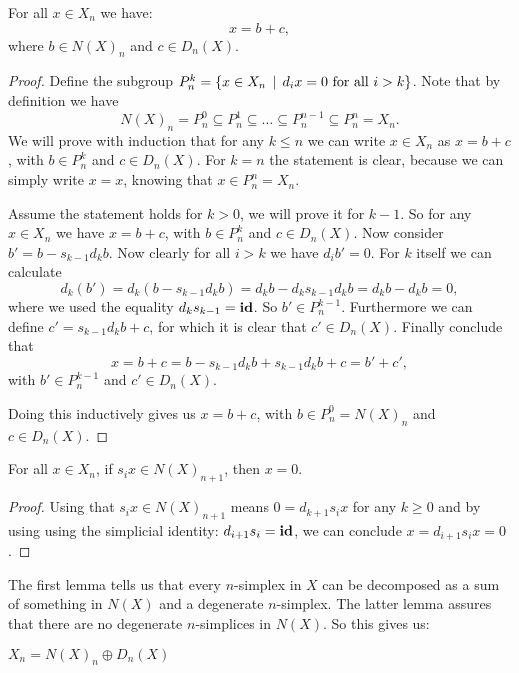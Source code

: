 \begin{lemma}
	\label{le:decomp1}
	For all $x \in X_n$ we have:
	$$ x = b + c,$$
	where $b \in N(X)_n$ and $c \in D_n(X)$.
\end{lemma}
\begin{proof}
	Define the subgroup $P_n^k = \{ x \in X_n \,\mid\, d_i x = 0 \text{ for all } i > k\}$. Note that by definition we have
	$$ N(X)_n = P_n^0 \subseteq P_n^1 \subseteq \ldots \subseteq P_n^{n-1} \subseteq P_n^n = X_n. $$
	We will prove with induction that for any $k \leq n$ we can write $x \in X_n$ as $x = b + c$, with $b \in P_n^k$ and $c \in D_n(X)$. For $k = n$ the statement is clear, because we can simply write $x = x$, knowing that $x \in P_n^n = X_n$.

	Assume the statement holds for $k > 0$, we will prove it for $k-1$. So for any $x \in X_n$ we have $x = b + c$, with $b \in P_n^k$ and $c \in D_n(X)$. Now consider $b' = b - s_{k-1} d_k b$. Now clearly for all $i > k$ we have $d_i b' = 0$. For $k$ itself we can calculate
	$$ d_k(b') = d_k(b - s_{k-1} d_k b) = d_k b - d_k s_{k-1} d_k b = d_k b - d_k b = 0, $$
	where we used the equality $d_k s_{k-1} = \mathbf{id}$. So $b' \in P_n^{k-1}$. Furthermore we can define $c' = s_{k-1} d_k b + c$, for which it is clear that $c' \in D_n(X)$. Finally conclude that
	$$ x = b + c = b - s_{k-1} d_k b + s_{k-1} d_k b + c = b' + c',$$
	with $b' \in P_n^{k-1}$ and $c' \in D_n(X)$.

	Doing this inductively gives us $x = b + c$, with $b \in P_n^0 = N(X)_n$ and $c \in D_n(X)$.
\end{proof}
\begin{lemma}
	\label{le:decomp2}
	For all $x \in X_n$, if $s_i x \in N(X)_{n+1}$, then $x = 0$.
\end{lemma}
\begin{proof}
	Using that $s_i x \in N(X)_{n+1}$ means $0 = d_{k+1} s_i x$ for any $k \geq 0$ and by using using the simplicial identity: $d_{i+1} s_i = \mathbf{id}$, we can conclude $x = d_{i+1} s_i x = 0$.
\end{proof}

The first lemma tells us that every $n$-simplex in $X$ can be decomposed as a sum of something in $N(X)$ and a degenerate $n$-simplex. The latter lemma assures that there are no degenerate $n$-simplices in $N(X)$. So this gives us:

\begin{corollary}
	\label{cor:NandD}
	$X_n = N(X)_n \oplus D_n(X)$
\end{corollary}

